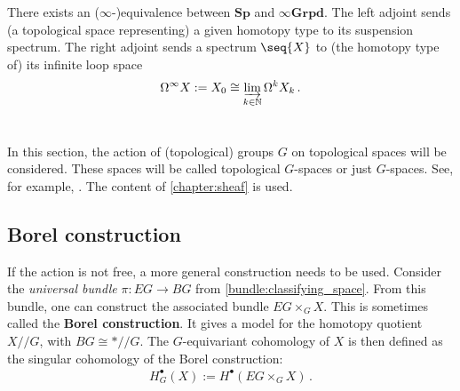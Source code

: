     \begin{property}
        There exists an ($\infty$-)equivalence between $\mathbf{Sp}$ and $\infty\mathbf{Grpd}$. The left adjoint sends (a topological space representing) a given homotopy type to its suspension spectrum. The right adjoint sends a spectrum $\seq{X}$ to (the homotopy type of) its infinite loop space
        \begin{gather}
            \Omega^\infty X:=X_0\cong\varinjlim_{k\in\mathbb{N}}\Omega^kX_k\,.
        \end{gather}
    \end{property}

\section{}

    In this section, the action of (topological) groups $G$ on topological spaces will be considered. These spaces will be called topological $G$-spaces or just $G$-spaces. See, for example, \citet{cartier_mad_2001,rozenblyum_bung_2023}. The content of \cref{chapter:sheaf} is used.

\subsection{Borel construction}


    If the action is not free, a more general construction needs to be used. Consider the \textit{universal bundle} $\pi:EG\rightarrow BG$ from \cref{bundle:classifying_space}. From this bundle, one can construct the associated bundle $EG\times_G X$. This is sometimes called the \textbf{Borel construction}. It gives a model for the homotopy quotient $X/\!\!/G$, with $BG\cong\ast/\!\!/G$. The $G$-equivariant cohomology of $X$ is then defined as the singular cohomology of the Borel construction:
    \begin{gather}
        H_G^\bullet(X) := H^\bullet(EG\times_GX)\,.
    \end{gather}

